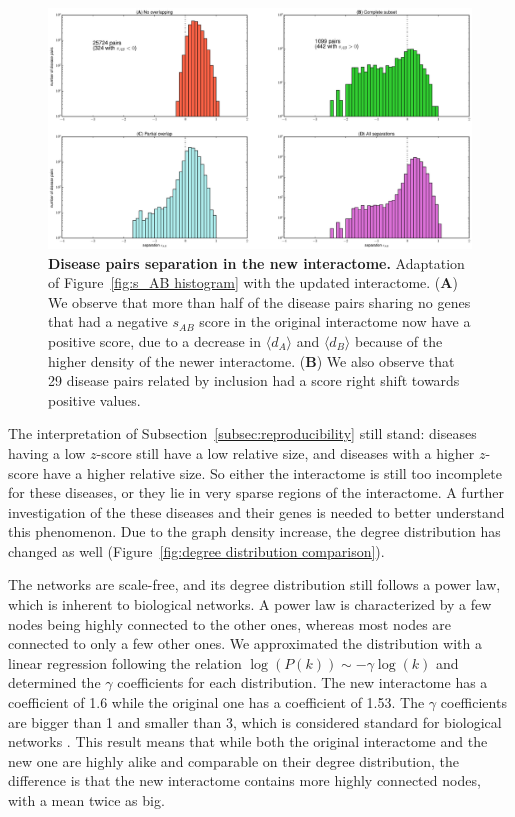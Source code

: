 \documentclass[letterpaper]{article}
\begin{document}
	\begin{figure}[!b]
		\hspace{-1.8cm}
		\vspace{-1cm}
		\includegraphics[scale=.35]{images/new_interactome_s_AB_histogram.eps}
		\caption{{\bf Disease pairs separation in the new interactome.} Adaptation of Figure~\ref{fig:s_AB histogram} with the
		updated interactome.
		({\bf A}) We observe that more than half of the disease pairs sharing no genes that had a negative $s_{AB}$ score
		in the original interactome now have a positive score, due to a decrease in $\langle d_A \rangle$ and $\langle d_B \rangle$
		because of the higher density of the newer interactome. ({\bf B}) We also observe that 29 disease pairs related by inclusion
		had a score right shift towards positive values.
		\label{fig:new interactome s_AB}}
	\end{figure}

	The interpretation of Subsection~\ref{subsec:reproducibility} still stand: diseases having
	a low $z$-score still have a low relative size, and diseases with a higher $z$-score have a higher
	relative size. So either the interactome is still too incomplete for these diseases, or they lie in
	very sparse regions of the interactome. A further investigation of the these diseases and their genes
	is needed to better understand this phenomenon. Due to the graph density increase, the degree
	distribution has changed as well (Figure~\ref{fig:degree distribution comparison}).


	The networks are scale-free, and its degree distribution still follows a power law, which is inherent to
	biological networks. A power law is characterized by a few nodes being highly connected to the other ones,
	whereas most nodes are connected to only a few other ones. We approximated the distribution with a linear
	regression following the relation $\log(P(k)) \sim -\gamma\log(k)$ and determined the $\gamma$ coefficients
	for each distribution. The new interactome has a coefficient of 1.6 while the original one has a coefficient
	of 1.53. The $\gamma$ coefficients are bigger than 1 and smaller than 3, which is considered standard for
	biological networks \citep{UnderstandingTheCellFunctionalOrganization,vidal2011interactome}. This result
	means that while both the original interactome and the new one are highly alike and comparable on their
	degree distribution, the difference is that the new interactome contains more highly connected nodes,
	with a mean twice as big.
\end{document}
